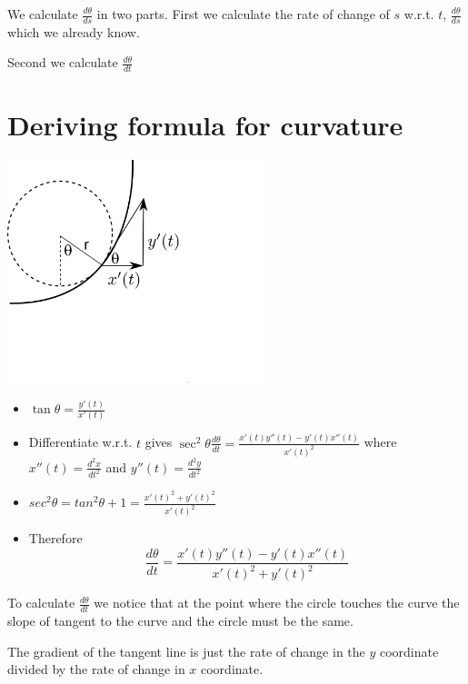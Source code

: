 \documentclass[]{article} %
\theoremstyle{definition}
\theoremstyle{theorem}
\begin{document}
We calculate $\frac{d\theta}{ds}$ in two parts. First we calculate the rate of change of $s$ w.r.t. $t$, $\frac{d\theta}{ds}$ which we already know.

Second we calculate $\frac{d\theta}{dt}$

\section{Deriving formula for curvature}
\begin{tcolorbox}
	\begin{minipage}{\linewidth}
		\centering
		\includegraphics[width=75mm, scale=0.65]{curvature_illustration_2.png}
	\end{minipage}
	\begin{itemize}
		\item $\tan \theta = \frac{y'(t)}{x'(t)}$ 
		\item Differentiate w.r.t. $t$ gives $\sec ^2 \theta \frac{d\theta}{dt} = \frac{x'(t) y''(t) - y'(t) x''(t)}{x'(t)^2}$
		where $x''(t)=\frac{d^2 x}{dt^2}$ and $y''(t)=\frac{d^2 y}{dt^2}$
		\item $sec^2\theta = tan^2\theta +1 = \frac{{x'(t)^2+y'(t)^2}}{x'(t)^2}$ 
		\item Therefore
		\begin{equation} \label{eq:2}
			\frac{d\theta}{dt}=\frac{x'(t) y''(t) - y'(t) x''(t)}{x'(t)^2+y'(t)^2}
		\end{equation}
	\end{itemize}
\end{tcolorbox}

To calculate $\frac{d\theta}{dt}$ we notice that at the point where the circle touches the curve the slope of tangent to the curve and the circle must be the same.

The gradient of the tangent line is just the rate of change in the $y$ coordinate divided by the rate of change in $x$ coordinate.
\end{document}
